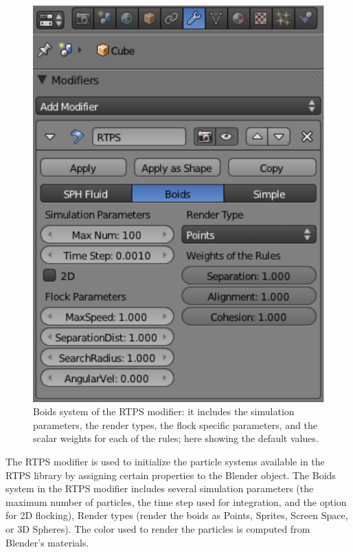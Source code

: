 \begin{figure}[htbp]
\begin{center}
\includegraphics[scale=0.8]{figures/modifier.pdf}
\caption{Boids system of the RTPS modifier: it includes the simulation parameters, the render types, the flock specific parameters, and the scalar weights for each of the rules; here showing the default values.}
\label{ui}
\end{center}
\end{figure}

The RTPS modifier is used to initialize the particle systems available in the RTPS library by assigning certain properties to the Blender object. The Boids system in the RTPS modifier includes several simulation parameters (the maximum number of particles, the time step used for integration, and the option for 2D flocking), Render types (render the boids as Points, Sprites, Screen Space, or 3D Spheres). The color used to render the particles is computed  from Blender's materials.

